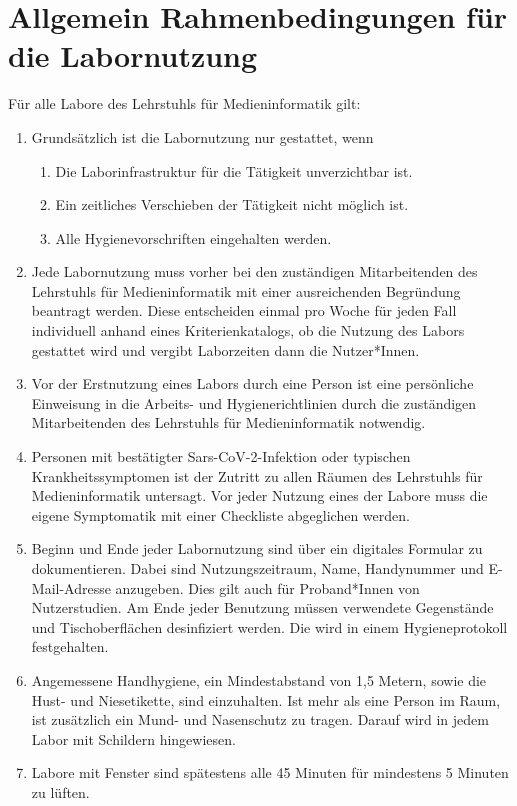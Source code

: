 \section{Allgemein Rahmenbedingungen für die Labornutzung}

\noindent
Für alle Labore des Lehrstuhls für Medieninformatik gilt:

\begin{enumerate}
    \item Grundsätzlich ist die Labornutzung nur gestattet, wenn
    \begin{enumerate}
        \item Die Laborinfrastruktur für die Tätigkeit unverzichtbar ist.
        \item Ein zeitliches Verschieben der Tätigkeit nicht möglich ist.
        \item Alle Hygienevorschriften eingehalten werden.
    \end{enumerate}
    \item{Jede Labornutzung muss vorher bei den zuständigen Mitarbeitenden des Lehrstuhls für Medieninformatik mit einer ausreichenden Begründung beantragt werden.
    Diese entscheiden einmal pro Woche für jeden Fall individuell anhand eines Kriterienkatalogs, ob die Nutzung des Labors gestattet wird und vergibt Laborzeiten dann die Nutzer*Innen.}
    \item{Vor der Erstnutzung eines Labors durch eine Person ist eine persönliche Einweisung in die Arbeits- und Hygienerichtlinien durch die zuständigen Mitarbeitenden des Lehrstuhls für Medieninformatik notwendig.}
    \item{Personen mit bestätigter Sars-CoV-2-Infektion oder typischen Krankheitssymptomen ist der Zutritt zu allen Räumen des Lehrstuhls für Medieninformatik untersagt.
    Vor jeder Nutzung eines der Labore muss die eigene Symptomatik mit einer Checkliste abgeglichen werden.}
    \item{Beginn und Ende jeder Labornutzung sind über ein digitales Formular zu dokumentieren.
    Dabei sind Nutzungszeitraum, Name, Handynummer und E-Mail-Adresse anzugeben.
    Dies gilt auch für Proband*Innen von Nutzerstudien.
    Am Ende jeder Benutzung müssen verwendete Gegenstände und Tischoberflächen desinfiziert werden.
    Die wird in einem Hygieneprotokoll festgehalten.}
    \item{Angemessene Handhygiene, ein Mindestabstand von 1,5 Metern, sowie die Hust- und Niesetikette, sind einzuhalten.
    Ist mehr als eine Person im Raum, ist zusätzlich ein Mund- und Nasenschutz zu tragen.
    Darauf wird in jedem Labor mit Schildern hingewiesen.}
    \item{Labore mit Fenster sind spätestens alle 45 Minuten für mindestens 5 Minuten zu lüften.}
\end{enumerate}
